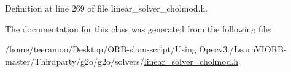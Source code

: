 Definition at line 269 of file linear\+\_\+solver\+\_\+cholmod.\+h.



The documentation for this class was generated from the following file\+:\begin{DoxyCompactItemize}
\item 
/home/teeramoo/\+Desktop/\+O\+R\+B-\/slam-\/script/\+Using Opecv3./\+Learn\+V\+I\+O\+R\+B-\/master/\+Thirdparty/g2o/g2o/solvers/\hyperlink{linear__solver__cholmod_8h}{linear\+\_\+solver\+\_\+cholmod.\+h}\end{DoxyCompactItemize}
